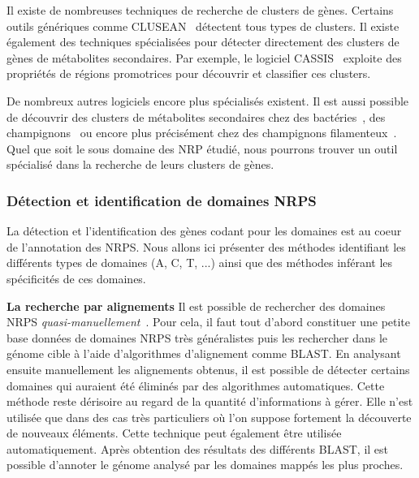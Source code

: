 Il existe de nombreuses techniques de recherche de clusters de gènes.
Certains outils génériques comme CLUSEAN~\cite{weber_clusean:_2009} détectent tous types de clusters.
Il existe également des techniques spécialisées pour détecter directement des clusters de gènes de métabolites secondaires.
Par exemple, le logiciel CASSIS~\cite{wolf_cassis_2016} exploite des propriétés de régions promotrices pour découvrir et classifier ces clusters.

De nombreux autres logiciels encore plus spécialisés existent.
Il est aussi possible de découvrir des clusters de métabolites secondaires chez des bactéries~\cite{cruz-morales_recapitulation_2015}, des champignons~\cite{khaldi_smurf:_2010} ou encore plus précisément chez des champignons filamenteux~\cite{andersen_accurate_2013,umemura_motif-independent_2015}.
Quel que soit le sous domaine des NRP étudié, nous pourrons trouver un outil spécialisé dans la recherche de leurs clusters de gènes.


\subsubsection{Détection et identification de domaines NRPS}

La détection et l'identification des gènes codant pour les domaines est au coeur de l'annotation des NRPS.
Nous allons ici présenter des méthodes identifiant les différents types de domaines (A, C, T, ...) ainsi que des méthodes inférant les spécificités de ces domaines.

\textbf{La recherche par alignements}
Il est possible de rechercher des domaines NRPS \textit{quasi-manuellement}~\cite{bachmann_chapter_2009}.
Pour cela, il faut tout d'abord constituer une petite base données de domaines NRPS très généralistes puis les rechercher dans le génome cible à l'aide d'algorithmes d'alignement comme BLAST.
En analysant ensuite manuellement les alignements obtenus, il est possible de détecter certains domaines qui auraient été éliminés par des algorithmes automatiques.
Cette méthode reste dérisoire au regard de la quantité d'informations à gérer.
Elle n'est utilisée que dans des cas très particuliers où l'on suppose fortement la découverte de nouveaux éléments.
Cette technique peut également être utilisée automatiquement.
Après obtention des résultats des différents BLAST, il est possible d'annoter le génome analysé par les domaines mappés les plus proches.

